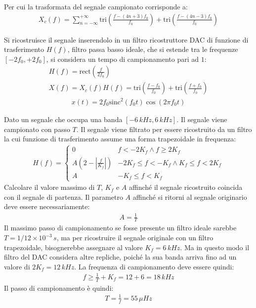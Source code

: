 \documentclass{article}
\newcommand{\rect}{\mbox{rect}}
\newcommand{\sinc}{\mbox{sinc}}
\begin{document}
Per cui la trasformata del segnale campionato corrisponde a:
\begin{gather*}
    X_c(f)=\displaystyle\sum_{n=-\infty}^{+\infty}\mbox{tri}\left(\frac{f-(4n+3)f_0}{f_0}\right)+\mbox{tri}\left(\frac{f-(4n-3)f_0}{f_0}\right)
\end{gather*}

Si ricostruisce il segnale inserendolo in un filtro ricostruttore DAC di funzione di trasferimento $H(f)$, filtro passa basso ideale, che si estende tra le 
frequenze $[-2f_0,+2f_0]$, si considera un tempo di campionamento pari ad $1$:
\begin{gather*}
    H(f)=\displaystyle\rect\left(\frac{f}{2f_0}\right)\\
    X(f)=X_c(f)H(f)=\displaystyle\mbox{tri}\left(\frac{f-f_0}{f_0}\right)+\mbox{tri}\left(\frac{f+f_0}{f_0}\right)
\end{gather*}
\begin{gather}
    x(t)=2f_0\sinc^2(f_0t)\cos(2\pi f_0t)
\end{gather} 



Dato un segnale che occupa una banda $[-6\,kHz, 6\,kHz]$. Il segnale viene campionato con passo $T$. Il segnale viene filtrato per essere ricostruito da un filtro 
la cui funzione di trasferimento assume una forma trapezoidale in frequenza:
\begin{gather*}
    H(f)=\begin{cases}
        0 &f<-2K_f\land f\geq 2K_f\\
        A\left(2-\left|\displaystyle\frac{f}{K_f}\right|\right) &-2K_f\leq f<-K_f\land K_f\leq f<2K_f\\
        A & -K_f\leq f<K_f
    \end{cases}
\end{gather*}
Calcolare il valore massimo di $T$, $K_f$ e $A$ affinché il segnale ricostruito coincida con il segnale di partenza. 
Il parametro $A$ affinché si ritorni al segnale originario deve essere necessariamente: 
\begin{gather}
    A=\displaystyle\frac{1}{T}
\end{gather}
Il massimo passo di campionamento se fosse presente un filtro ideale sarebbe $T=1/12\times10^{-3}\,s$, ma per ricostruire il segnale originale con un filtro trapezoidale, bisognerebbe 
assegnare al valore $K_f=6\,kHz$. Ma in questo modo il filtro del DAC considera altre repliche, poiché la sua banda arriva fino ad un valore di $2K_f=12\,kHz$. La frequenza di 
campionamento deve essere quindi:
\begin{gather*}
    f\geq\displaystyle\frac{1}{T}+K_f=12+6=18\,kHz
\end{gather*}
Il passo di campionamento è quindi:
\begin{gather}
    T=\displaystyle\frac{1}{f}=55\,\mu Hz
\end{gather}
\end{document}
